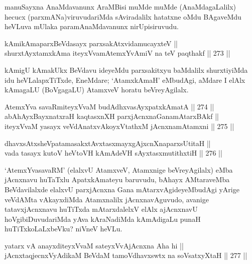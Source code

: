 \begin{artha}
manuSayxna AnaMdavanunx AraMBisi muMde muMde (AnaMdagaLalilx) hecucx
(parxmANa)viruvudariMda sAviradalilx hatatxne oMdu BAgaveMdu heVLuva
mUlaka paramAnaMdavanunx nirUpisiruvudu.
\end{artha}


\begin{shl}
kAmikAmaparxBeVdasayx parxsakAtxvidamucayxteV || \\
shurxtAyx\s \s tamxkAma iteyxVvamAtemxYvAmiV na teV paqthakf ||  273 ||  
\end{shl}

\begin{artha}
kAmigU kAmakUkx BeVdavu ideyeMdu parxsakitxyu baMdalilx shurxtiyiMda
idu heVLalapxTiTxde, EneMdare; `AtamxkAmaH' eMbudAgi, aMdare I elAlx
kAmagaLU (BoVgagaLU) AtamxveV horatu beVreyAgilalx.
\end{artha}


\begin{shl}
AtemxYva savaRmiteyxVvaM budAdhxvasAyx\s \s patxkAmatA ||  274 ||  \\
abAhAyxBayxnatxraH kaqtasxnXH parxjAcnxnaGanamAtarxBAkf || \\
iteyxVvaM yasayx veVdAnatxvAkoyxVtathxM jAcnxnamAtamxni ||  275 ||  
\end{shl}

\begin{shl}
dhavxsAtxsheVpatamasakxtAvxtasxmayxgAjxcnXnaparxsUtitaH || \\
vada tasayx kutoV heVtoVH kAmAdeVH sAyxtasxmutithxtiH ||  276 ||  
\end{shl}

\begin{artha}
`AtemxYvasavaRM' (elalxvU AtamxveV, Atamxnige beVreyAgilalx) eMba
jAcnxnavu huTaTxlu ApatxkAmateyu baruvudu, bAhayx AMtaraveMba
BeVdavilalxde elalxvU parxjAcnxna Gana mAtarxvAgideyeMbudAgi yArige
veVdAMta vAkayxdiMda Atamxnalilx jAcnxnavAguvudo, avanige
tatavxjAcnxnavu huTiTxda mAtarxdalelxV elAlx ajAcnxnavU
hoVgibiDuvudariMda yAva kAraNadiMda kAmAdigaLu punaH
huTiTxkoLaLxbeVku? niVneV heVLu.
\end{artha}


\begin{shl}
yatarx vA anayxditeyxVvaM sateyxVvAjAcnxna Aha hi || \\
jAcnxtaqjecnxVyAdikaM BeVdaM tamoVdhavxswtx na soV\s satxyXtaH ||  277 || 
\end{shl}

